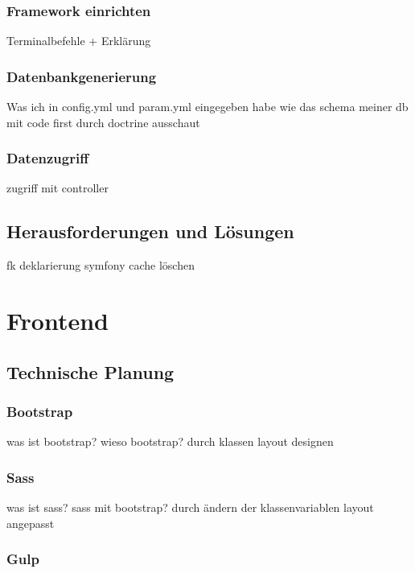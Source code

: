     \subsubsection{Framework einrichten}

Terminalbefehle + Erklärung

    \subsubsection{Datenbankgenerierung}

Was ich in config.yml und param.yml eingegeben habe
wie das schema meiner db mit code  first durch doctrine ausschaut

    \subsubsection{Datenzugriff}

zugriff mit controller

  \subsection{Herausforderungen und Lösungen}

fk deklarierung
symfony cache löschen

\section{Frontend}

  \subsection{Technische Planung}

    \subsubsection{Bootstrap}

was ist bootstrap? wieso bootstrap? durch klassen layout designen

    \subsubsection{Sass}

was ist sass? sass mit bootstrap?
durch ändern der klassenvariablen layout angepasst

    \subsubsection{Gulp}

